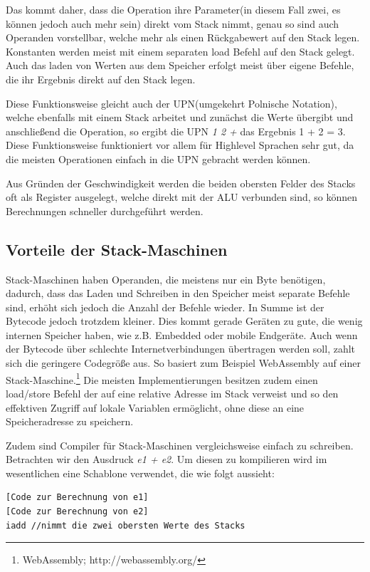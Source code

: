 \documentclass[a4paper, 11pt]{article}
\begin{document}
	Das kommt daher, dass die Operation ihre Parameter(in diesem Fall zwei, es können jedoch auch mehr sein) direkt vom Stack nimmt, genau so sind auch Operanden vorstellbar, welche mehr als einen Rückgabewert auf den Stack legen.
	Konstanten werden meist mit einem separaten load Befehl auf den Stack gelegt. Auch das laden von Werten aus dem Speicher erfolgt meist über eigene Befehle, die ihr Ergebnis direkt auf den Stack legen.
	
	Diese Funktionsweise gleicht auch der UPN(umgekehrt Polnische Notation), welche ebenfalls mit einem Stack arbeitet und zunächst die Werte übergibt und anschließend die Operation, so ergibt die UPN \textit{1 2 +} das Ergebnis 1 + 2 = 3. Diese Funktionsweise funktioniert vor allem für Highlevel Sprachen sehr gut, da die meisten Operationen einfach in die UPN gebracht werden können. 

	Aus Gründen der Geschwindigkeit werden die beiden obersten Felder des Stacks oft als Register ausgelegt, welche direkt mit der ALU verbunden sind, so können Berechnungen schneller durchgeführt werden.
	
	\subsection{Vorteile der Stack-Maschinen}
	
	Stack-Maschinen haben Operanden, die meistens nur ein Byte benötigen, dadurch, dass das Laden und Schreiben in den Speicher meist separate Befehle sind, erhöht sich jedoch die Anzahl der Befehle wieder. In Summe ist der Bytecode jedoch trotzdem kleiner. Dies kommt gerade Geräten zu gute, die wenig internen Speicher haben, wie z.B. Embedded oder mobile Endgeräte. Auch wenn der Bytecode über schlechte Internetverbindungen übertragen werden soll, zahlt sich die geringere Codegröße aus. So basiert zum Beispiel WebAssembly auf einer Stack-Maschine.\footnote{WebAssembly; http://webassembly.org/} Die meisten Implementierungen besitzen zudem einen load/store Befehl der auf eine relative Adresse im Stack verweist und so den effektiven Zugriff auf lokale Variablen ermöglicht, ohne diese an eine Speicheradresse zu speichern. 
	
	
	Zudem sind Compiler für Stack-Maschinen vergleichsweise einfach zu schreiben. Betrachten wir den Ausdruck \textit{e1 + e2}. Um diesen zu kompilieren wird im wesentlichen eine Schablone verwendet, die wie folgt aussieht: 
	\lstset{language=JVMIS}
	\begin{lstlisting}
[Code zur Berechnung von e1]
[Code zur Berechnung von e2]
iadd //nimmt die zwei obersten Werte des Stacks
	\end{lstlisting}
	
\end{document}
